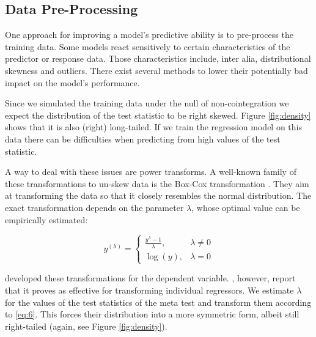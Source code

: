 \documentclass[12pt,a4paper]{article}
\begin{document}
\hypertarget{data-pre-processing}{%
\subsection{Data Pre-Processing}\label{data-pre-processing}}

One approach for improving a model's predictive ability is to
pre-process the training data. Some models react sensitively to certain
characteristics of the predictor or response data. Those characteristics
include, inter alia, distributional skewness and outliers. There exist
several methods to lower their potentially bad impact on the model's
performance.

Since we simulated the training data under the null of non-cointegration
we expect the distribution of the test statistic to be right skewed.
Figure \ref{fig:density} shows that it is also (right) long-tailed. If
we train the regression model on this data there can be difficulties
when predicting from high values of the test statistic.

A way to deal with these issues are power transforms. A well-known
family of these transformations to un-skew data is the Box-Cox
transformation \autocite{Boxcox_1964}. They aim at transforming the data
so that it closely resembles the normal distribution. The exact
transformation depends on the parameter \(\lambda\), whose optimal value
can be empirically estimated:

\begin{equation}
y^{(\lambda)} =
    \begin{cases}
    \frac{y^{\lambda} - 1}{\lambda}, & \lambda \neq 0 \\
    \log{(y)}, & \lambda = 0
    \end{cases}
\label{eq:6}
\end{equation}

\textcite{Boxcox_1964} developed these transformations for the dependent
variable. \textcite{Kuhn_2013}, however, report that it proves as
effective for transforming individual regressors. We estimate
\(\lambda\) for the values of the test statistics of the meta test and
transform them according to \eqref{eq:6}. This forces their distribution
into a more symmetric form, albeit still right-tailed (again, see Figure
\ref{fig:density}).
\end{document}
